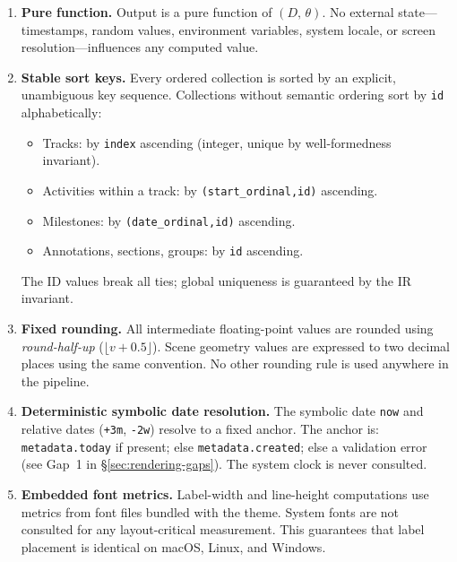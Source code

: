 \begin{enumerate}
  \item \textbf{Pure function.}
        Output is a pure function of $(D,\,\theta)$. No external state---timestamps, random
        values, environment variables, system locale, or screen resolution---influences any
        computed value.

  \item \textbf{Stable sort keys.}
        Every ordered collection is sorted by an explicit, unambiguous key sequence.
        Collections without semantic ordering sort by \texttt{id} alphabetically:
        \begin{itemize}
          \item Tracks: by \texttt{index} ascending (integer, unique by well-formedness invariant).
          \item Activities within a track: by \texttt{(start\_ordinal,\;id)} ascending.
          \item Milestones: by \texttt{(date\_ordinal,\;id)} ascending.
          \item Annotations, sections, groups: by \texttt{id} ascending.
        \end{itemize}
        The ID values break all ties; global uniqueness is guaranteed by the IR invariant.

  \item \textbf{Fixed rounding.}
        All intermediate floating-point values are rounded using \emph{round-half-up}
        ($\lfloor v + 0.5 \rfloor$). Scene geometry values are expressed to two decimal
        places using the same convention. No other rounding rule is used anywhere in the
        pipeline.

  \item \textbf{Deterministic symbolic date resolution.}
        The symbolic date \texttt{now} and relative dates (\texttt{+3m}, \texttt{-2w})
        resolve to a fixed anchor. The anchor is: \texttt{metadata.today} if present;
        else \texttt{metadata.created}; else a validation error (see Gap~1 in
        \S\ref{sec:rendering-gaps}). The system clock is never consulted.

  \item \textbf{Embedded font metrics.}
        Label-width and line-height computations use metrics from font files bundled with
        the theme. System fonts are not consulted for any layout-critical measurement.
        This guarantees that label placement is identical on macOS, Linux, and Windows.


\end{enumerate}
